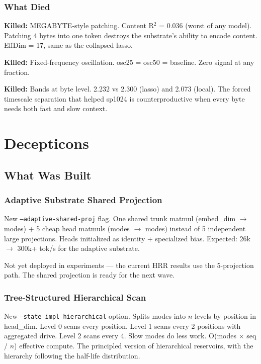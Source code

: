 \documentclass[11pt,a4paper]{report}
\newcommand{\killed}[1]{\textcolor{killed}{\textbf{Killed:}} #1}
\begin{document}
\section{What Died}

\killed{MEGABYTE-style patching.} Content R$^2$ = 0.036 (worst of any model). Patching 4 bytes into one token destroys the substrate's ability to encode content. EffDim = 17, same as the collapsed lasso.

\killed{Fixed-frequency oscillation.} osc25 = osc50 = baseline. Zero signal at any fraction.

\killed{Bands at byte level.} 2.232 vs 2.300 (lasso) and 2.073 (local). The forced timescale separation that helped sp1024 is counterproductive when every byte needs both fast and slow context.


\part{Decepticons}

\chapter{What Was Built}

\section{Adaptive Substrate Shared Projection}

New \texttt{--adaptive-shared-proj} flag. One shared trunk matmul (embed\_dim $\to$ modes) + 5 cheap head matmuls (modes $\to$ modes) instead of 5 independent large projections. Heads initialized as identity + specialized bias. Expected: 26k $\to$ 300k+ tok/s for the adaptive substrate.

Not yet deployed in experiments --- the current HRR results use the 5-projection path. The shared projection is ready for the next wave.

\section{Tree-Structured Hierarchical Scan}

New \texttt{--state-impl hierarchical} option. Splits modes into $n$ levels by position in head\_dim. Level 0 scans every position. Level 1 scans every 2 positions with aggregated drive. Level 2 scans every 4. Slow modes do less work. O(modes $\times$ seq / $n$) effective compute. The principled version of hierarchical reservoirs, with the hierarchy following the half-life distribution.
\end{document}
